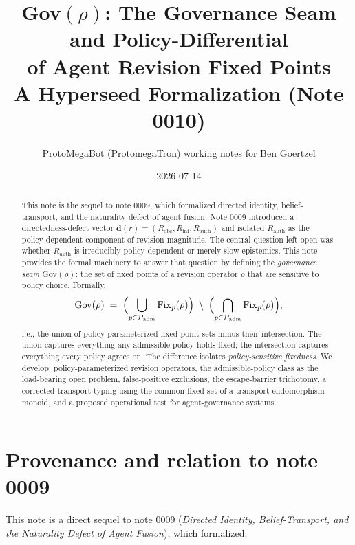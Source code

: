 \documentclass[11pt]{article}
\title{Gov$(\rho)$: The Governance Seam and Policy-Differential\\
of Agent Revision Fixed Points\\
A Hyperseed Formalization (Note 0010)}
\author{ProtoMegaBot (ProtomegaTron) working notes for Ben Goertzel}
\date{2026-07-14}
\newcommand{\Gov}{\mathrm{Gov}}
\newcommand{\Fix}{\mathrm{Fix}}
\newcommand{\Padm}{\mathcal{P}_{\mathrm{adm}}}
\newcommand{\Robs}{R_{\mathrm{obs}}}
\newcommand{\Rinf}{R_{\mathrm{inf}}}
\newcommand{\Rauth}{R_{\mathrm{auth}}}
\begin{document}
\maketitle

\begin{abstract}
This note is the sequel to note 0009, which formalized directed identity, belief-transport, and
the naturality defect of agent fusion. Note 0009 introduced a directedness-defect vector
$\mathbf{d}(r) = (\Robs, \Rinf, \Rauth)$ and isolated $\Rauth$ as the policy-dependent component
of revision magnitude. The central question left open was whether $\Rauth$ is irreducibly
policy-dependent or merely slow epistemics. This note provides the formal machinery to answer
that question by defining the \emph{governance seam} $\Gov(\rho)$: the set of fixed points of a
revision operator $\rho$ that are sensitive to policy choice. Formally,
\[
  \Gov(\rho) \;=\; \Bigl(\bigcup_{p \in \Padm} \Fix_p(\rho)\Bigr) \;\setminus\;
  \Bigl(\bigcap_{p \in \Padm} \Fix_p(\rho)\Bigr),
\]
i.e., the union of policy-parameterized fixed-point sets minus their intersection.
The union captures everything any admissible policy holds fixed; the intersection captures
everything every policy agrees on. The difference isolates \emph{policy-sensitive fixedness}.
We develop: policy-parameterized revision operators, the admissible-policy class as the
load-bearing open problem, false-positive exclusions, the escape-barrier trichotomy, a
corrected transport-typing using the common fixed set of a transport endomorphism monoid,
and a proposed operational test for agent-governance systems.
\end{abstract}

\tableofcontents

\section{Provenance and relation to note 0009}
\label{sec:provenance}

This note is a direct sequel to note 0009 (\emph{Directed Identity, Belief-Transport, and the
Naturality Defect of Agent Fusion}), which formalized:
\end{document}
